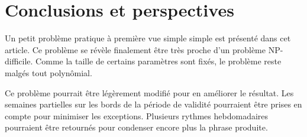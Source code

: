 \documentclass{roadef}
\begin{document}
\section{Conclusions et perspectives}

Un petit problème pratique à première vue simple simple est présenté
dans cet article. Ce problème se révèle finalement être très proche
d'un problème NP-difficile. Comme la taille de certains paramètres
sont fixés, le problème reste malgés tout polynômial.

Ce problème pourrait être légèrement modifié pour en améliorer le
résultat. Les semaines partielles sur les bords de la période de
validité pourraient être prises en compte pour minimiser les
exceptions. Plusieurs rythmes hebdomadaires pourraient être retournés
pour condenser encore plus la phrase produite.



\end{document}
